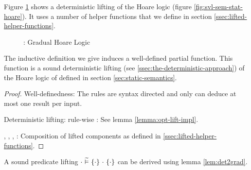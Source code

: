 Figure \ref{fig:gvl-sem-stat-hoare} shows a deterministic lifting of the Hoare logic (figure \ref{fig:svl-sem-stat-hoare}).
It uses a number of helper functions that we define in section \ref{ssec:lifted-helper-functions}.
\begin{figure}[h!]
    
    \caption{\gvl: Gradual Hoare Logic} 
    \label{fig:gvl-sem-stat-hoare}
\end{figure}

\begin{lemma}
    The inductive definition we give induces a well-defined partial function.
    This function is a sound deterministic lifting (see \ref{ssec:the-deterministic-approach}) of the Hoare logic of \svlidf defined in section \ref{sec:static-semantics}.
\end{lemma}
\begin{proof}
    Well-definedness: The rules are syntax directed and only can deduce at most one result per input.
    
    Deterministic lifting: rule-wise
    :
        See lemma \ref{lemma:opt-lift-impl}.
        
    , , , :
        Composition of lifted components as defined in \ref{ssec:lifted-helper-functions}.
\end{proof}

A sound predicate lifting ${\cdot} \,\,\widetilde{\vDash}\,\, \{{\cdot}\} ~{\cdot}~ \{{\cdot}\}$ can be derived using lemma \ref{lem:det2grad}.